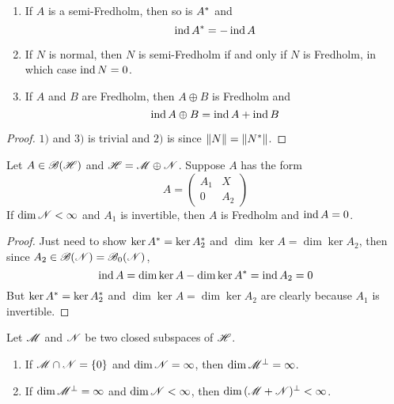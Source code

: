 \begin{prop}
	\begin{enumerate}[label=\arabic*)]
		\item If $A$ is a semi-Fredholm, then so is $A^{*}$ and
		\begin{equation*}
			\operatorname{ind}{A^{*}} = - \operatorname{ind}{A}
		\end{equation*}
		\item If $N$ is normal, then $N$ is semi-Fredholm if and only if $N$ is Fredholm, in which case $\operatorname{ind}{N} = 0$.
		\item If $A$ and $B$ are Fredholm, then $A \oplus B$ is Fredholm and 
		\begin{equation*}
			\operatorname{ind}{A \oplus B} = \operatorname{ind}{A} + \operatorname{ind}{B}
		\end{equation*}
	\end{enumerate}
\end{prop}
\begin{proof}
	$1)$ and $3)$ is trivial and $2)$ is since $\left\lVert N\right\lVert = \left\lVert N^{*}\right\lVert$.
\end{proof}

\begin{lem}
	Let $A \in \mathscr{B(H)}$ and $\mathscr{H} = \mathscr{M} \oplus \mathscr{N}$. Suppose $A$ has the form
	\begin{equation*}
		A = \left(
			\begin{array}{cc}
				A_1 & X \\
				0 & A_2
			\end{array}
		\right)
	\end{equation*}
	If $\dim{\mathscr{N}} < \infty$ and $A_1$ is invertible, then $A$ is Fredholm and $\operatorname{ind}{A} = 0$.
\end{lem}
\begin{proof}
	Just need to show $\ker{A^{*}} = \ker{A_2^{*}}$ and $\dim{\ker{A}} = \dim{\ker{A_2}}$, then since $A_2 \in \mathscr{B}(\mathscr{N})=\mathscr{B}_0(\mathscr{N})$, 
	\begin{equation*}
		\operatorname{ind}{A} = \dim{\ker{A}} - \dim{\ker{A^{*}}} = \operatorname{ind}{A_2} = 0
	\end{equation*}
	But $\ker{A^{*}} = \ker{A_2^{*}}$ and $\dim{\ker{A}} = \dim{\ker{A_2}}$ are clearly because $A_1$ is invertible.
\end{proof}

\begin{lem}
	Let $\mathscr{M}$ and $\mathscr{N}$ be two closed subspaces of $\mathscr{H}$.
	\begin{enumerate}[label = \arabic*)]
		\item If $\mathscr{M} \cap \mathscr{N} = \{0\}$ and $\dim{\mathscr{N}} = \infty$, then $\dim{\mathscr{M}^{\bot}} = \infty$.
		\item If $\dim{\mathscr{M}^{\bot}} = \infty$ and $\dim{\mathscr{N}} < \infty$, then $\dim{(\mathscr{M}+\mathscr{N})^{\bot}} < \infty$.
	\end{enumerate}
\end{lem}


